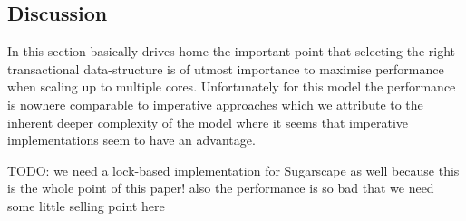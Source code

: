 \subsection{Discussion}
In this section basically drives home the important point that selecting the right transactional data-structure is of utmost importance to maximise performance when scaling up to multiple cores. Unfortunately for this model the performance is nowhere comparable to imperative approaches which we attribute to the inherent deeper complexity of the model where it seems that imperative implementations seem to have an advantage.

TODO: we need a lock-based implementation for Sugarscape as well because this is the whole point of this paper! also the performance is so bad that we need some little selling point here